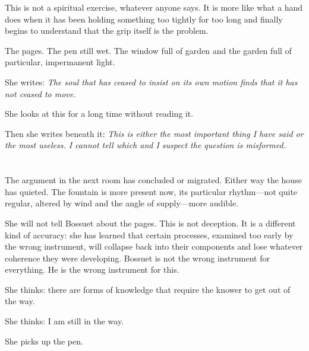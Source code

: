 This is not a spiritual exercise, whatever anyone says. It is more
like what a hand does when it has been holding something too tightly
for too long and finally begins to understand that the grip itself
is the problem.

The pages. The pen still wet. The window full of garden and the
garden full of particular, impermanent light.

She writes: \textit{The soul that has ceased to insist on its own motion
finds that it has not ceased to move.}

She looks at this for a long time without reading it.

Then she writes beneath it: \textit{This is either the most important
thing I have said or the most useless. I cannot tell which and I
suspect the question is misformed.}

\section{}

The argument in the next room has concluded or migrated. Either way
the house has quieted. The fountain is more present now, its
particular rhythm---not quite regular, altered by wind and the
angle of supply---more audible.

She will not tell Bossuet about the pages. This is not deception.
It is a different kind of accuracy: she has learned that certain
processes, examined too early by the wrong instrument, will
collapse back into their components and lose whatever coherence
they were developing. Bossuet is not the wrong instrument for
everything. He is the wrong instrument for this.

She thinks: there are forms of knowledge that require the knower
to get out of the way.

She thinks: I am still in the way.

She picks up the pen.

